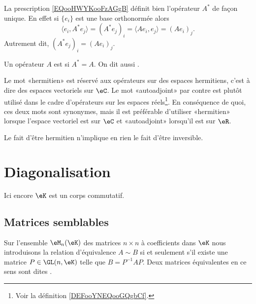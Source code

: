 La prescription \eqref{EQooHWYKooFzAGgB} définit bien l'opérateur \( A^*\) de façon unique. En effet si \( \{ e_i \}\) est une base orthonormée alors
\begin{equation}
    \langle e_i, A^*e_j\rangle =(A^*e_j)_i=\langle Ae_i, e_j\rangle =(Ae_i)_j.
\end{equation}
Autrement dit, \( (A^*e_j)_i=(Ae_i)_j\).

\begin{definition}      \label{DEFooKEBHooWwCKRK}
    Un opérateur \( A\) est  si \( A^*=A\). On dit aussi .
\end{definition}

Le mot «hermitien» est réservé aux opérateurs sur des espaces hermitiens, c'est à dire des espaces vectoriels sur \( \eC\). Le mot «autoadjoint» par contre est plutôt utilisé dans le cadre d'opérateurs sur les espaces réels\footnote{Voir la définition \ref{DEFooYNEQooGQgbCf}.}. En conséquence de quoi, ces deux mots sont synonymes, mais il est préférable d'utiliser «hermitien» lorsque l'espace vectoriel est sur \( \eC\) et «autoadjoint» lorsqu'il est sur \( \eR\).

\begin{remark}
    Le fait d'être hermitien n'implique en rien le fait d'être inversible.
\end{remark}

\section{Diagonalisation}

Ici encore \( \eK\) est un corps commutatif.

\subsection{Matrices semblables}

\begin{definition} \label{DefCQNFooSDhDpB}
    Sur l'ensemble \( \eM_n(\eK)\) des matrices \( n\times n\) à coefficients dans \(\eK\)
    nous introduisons la relation d'équivalence \( A\sim B\) si et seulement s'il existe une matrice \( P\in\GL(n,\eK)\) telle que \( B=P^{-1}AP\). Deux matrices équivalentes en ce sens sont dites .
\end{definition}

